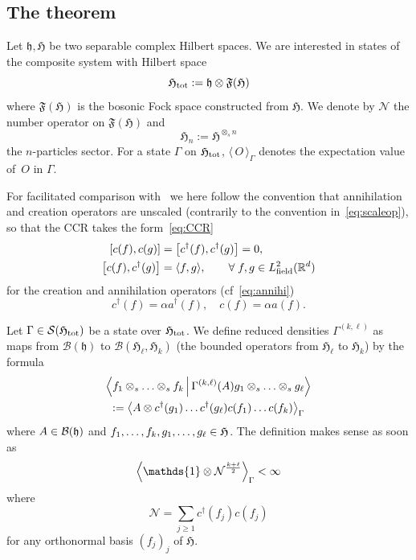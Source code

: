 \documentclass[AHL,Unicode,longabstracts,published]{cedram}
\DeclareMathOperator{\field}{field}
\newcommand{\cS}{\mathcal{S}}
\newcommand{\R}{\mathbb{R}}
\newcommand{\cN}{\mathcal{N}}
\newcommand{\gH}{\mathfrak{H}}
\newcommand{\gF}{\mathfrak{F}}
\newcommand{\gh}{\mathfrak{h}}
\newcommand{\cB}{\mathcal{B}}
\newcommand{\1}{\mathds{1}}
\newcommand{\ada}{a^{\dagger}}
\newcommand{\cda}{c^{\dagger}}
\newcommand{\gHt}{\mathfrak{H}_{\rm tot}}
\let\oldin\in
\renewcommand{\in}{\mathchoice{\oldin}{\oldin}{\,\oldin\,}{\,\oldin\,}}
\let\originalleft\left
\let\originalright\right
\renewcommand{\left}{\mathopen{}\mathclose\bgroup\originalleft}
\renewcommand{\right}{\aftergroup\egroup\originalright}
\let\oldforall\forall
\renewcommand*{\forall}{\mathrel{\oldforall}}
\begin{document}
\subsection{The theorem}

Let $\gh,\gH$ be two separable complex Hilbert spaces. We are interested in states of the composite system with Hilbert space
\begin{equation*}
\gHt := \gh \otimes \gF(\gH)
\end{equation*}
where $\gF(\gH)$ is the bosonic Fock space constructed from $\gH$. We denote by $\cN$ the number operator on $\gF(\gH)$ and
\begin{equation*}
\gH_n := \gH^{\otimes_s n}
\end{equation*}
the $n$-particles sector. For a state $\Gamma$ on $\gHt$, $ \langle \, O \, \rangle_{\Gamma} $ denotes the expectation value of~$O$ in $\Gamma$.

For facilitated comparison with~\cite{LewNamRou-14d} we here follow the convention that annihilation and creation operators are unscaled (contrarily to the convention in~\eqref{eq:scaleop}), so that the CCR takes the form~\eqref{eq:CCR}
\begin{equation}\label{eq:CCRagain}
\begin{split}
[c(f),c(g)] &=\left[c^\dagger(f),c^\dagger(g)\right]=0,\\
\left[c(f),c^\dagger(g)\right] &=\langle f,g\rangle, \qquad \forall f,g\in L_{\field}^2(\R^d)
\end{split}
\end{equation}
for the creation and annihilation operators (cf~\eqref{eq:annihi})
\begin{equation*}
c^\dagger (f) = \alpha \ada (f), \quad c(f)= \alpha a(f).
\end{equation*}


\begin{defi}\label{def:sym state}
Let $\Gamma \in \cS (\gHt)$ be a state over $\gHt$. We define reduced densities $\Gamma ^{(k,\ell)}$ as maps from $\cB(\gh)$ to $\cB (\gH_\ell,\gH_k)$ (the bounded operators from $\gH_\ell$ to $\gH_k$) by the formula
\begin{multline}\label{eq:red dens}
\left\langle f_1\otimes_s \ldots \otimes_s f_k \,\middle|\,\Gamma ^{(k,\ell)} (A) g_1\otimes_s \ldots \otimes_s g_\ell\right\rangle\\
:= \left\langle A \otimes \cda (g_1) \ldots \cda (g_\ell) c (f_1) \ldots c(f_k) \right\rangle_\Gamma
\end{multline}
where $A\in \cB (\gh)$ and $f_1,\ldots,f_k,g_1,\ldots,g_\ell \in \gH$. The definition makes sense as soon as
\begin{equation*}
\left\langle \1\otimes \cN ^{\frac{k+\ell}{2}}\right\rangle_\Gamma < \infty
\end{equation*}
where
\begin{equation*}
\cN = \sum_{j\geq 1} \cda (f_j) c(f_j)
\end{equation*}
for any orthonormal basis $(f_j)_j$ of $\gH$.
\end{defi}
\end{document}
